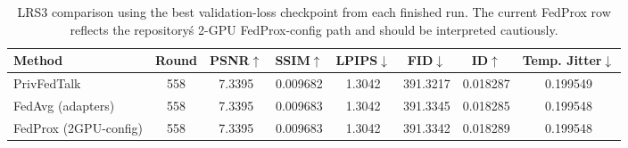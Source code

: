 \begin{table}[t]
\centering
\caption{LRS3 comparison using the best validation-loss checkpoint from each finished run. The current FedProx row reflects the repository\'s 2-GPU FedProx-config path and should be interpreted cautiously.}
\label{tab:lrs3_bestloss_current}
\begin{tabular}{lccccccc}
\toprule
Method & Round & PSNR$\uparrow$ & SSIM$\uparrow$ & LPIPS$\downarrow$ & FID$\downarrow$ & ID$\uparrow$ & Temp. Jitter$\downarrow$ \\
\midrule
PrivFedTalk & 558 & 7.3395 & 0.009682 & 1.3042 & 391.3217 & 0.018287 & 0.199549 \\
FedAvg (adapters) & 558 & 7.3395 & 0.009683 & 1.3042 & 391.3345 & 0.018285 & 0.199548 \\
FedProx (2GPU-config) & 558 & 7.3395 & 0.009683 & 1.3042 & 391.3342 & 0.018289 & 0.199548 \\
\bottomrule
\end{tabular}
\end{table}
